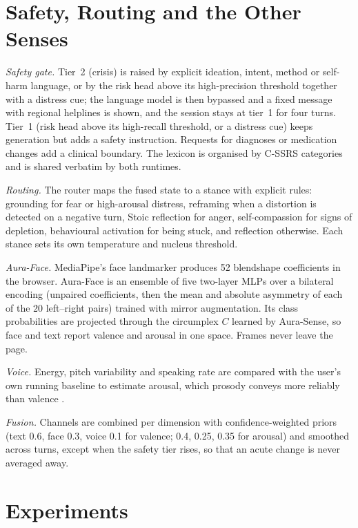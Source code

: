 \documentclass[conference]{IEEEtran}
\begin{document}
\section{Safety, Routing and the Other Senses}

\textit{Safety gate.} Tier~2 (crisis) is raised by explicit ideation, intent, method or self-harm language, or by the risk head above its high-precision threshold together with a distress cue; the language model is then bypassed and a fixed message with regional helplines is shown, and the session stays at tier~1 for four turns. Tier~1 (risk head above its high-recall threshold, or a distress cue) keeps generation but adds a safety instruction. Requests for diagnoses or medication changes add a clinical boundary. The lexicon is organised by C-SSRS categories \cite{posner2011} and is shared verbatim by both runtimes.

\textit{Routing.} The router maps the fused state to a stance with explicit rules: grounding for fear or high-arousal distress, reframing when a distortion is detected on a negative turn, Stoic reflection for anger, self-compassion for signs of depletion, behavioural activation for being stuck, and reflection otherwise. Each stance sets its own temperature and nucleus threshold.

\textit{Aura-Face.} MediaPipe's face landmarker \cite{kartynnik2019} produces 52 blendshape coefficients in the browser. Aura-Face is an ensemble of five two-layer MLPs over a bilateral encoding (unpaired coefficients, then the mean and absolute asymmetry of each of the 20 left--right pairs) trained with mirror augmentation. Its class probabilities are projected through the circumplex $C$ learned by Aura-Sense, so face and text report valence and arousal in one space. Frames never leave the page.

\textit{Voice.} Energy, pitch variability and speaking rate are compared with the user's own running baseline to estimate arousal, which prosody conveys more reliably than valence \cite{scherer2003}.

\textit{Fusion.} Channels are combined per dimension with confidence-weighted priors (text 0.6, face 0.3, voice 0.1 for valence; 0.4, 0.25, 0.35 for arousal) and smoothed across turns, except when the safety tier rises, so that an acute change is never averaged away.

\section{Experiments}
\end{document}
